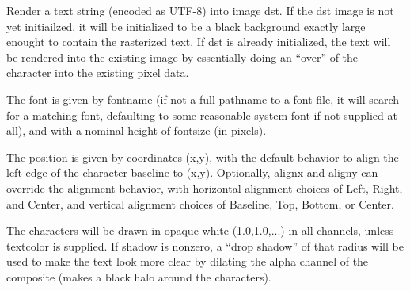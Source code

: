  

Render a text string (encoded as UTF-8) into image {\cf dst}. If the {\cf dst} image
is not yet initiailzed, it will be initialized to be a black background
exactly large enought to contain the rasterized text.  If {\cf dst} is already
initialized, the text will be rendered into the existing image by
essentially doing an ``over'' of the character into the existing pixel
data.

The font is given by {\cf fontname} (if not a full pathname to a font file, it
will search for a matching font, defaulting to some reasonable system
font if not supplied at all), and with a nominal height of {\cf fontsize} (in
pixels).

The position is given by coordinates ({\cf x,y}), with the default behavior
to align the left edge of the character baseline to ({\cf x,y}). Optionally,
{\cf alignx} and {\cf aligny} can override the alignment behavior, with horizontal
alignment choices of {\cf Left}, {\cf Right}, and {\cf Center}, and vertical alignment
choices of {\cf Baseline}, {\cf Top}, {\cf Bottom}, or {\cf Center}.

The characters will be drawn in opaque white (1.0,1.0,...) in all channels,
unless {\cf textcolor} is supplied. If {\cf shadow} is nonzero, a ``drop shadow'' of
that radius will be used to make the text look more clear by dilating the
alpha channel of the composite (makes a black halo around the characters).

